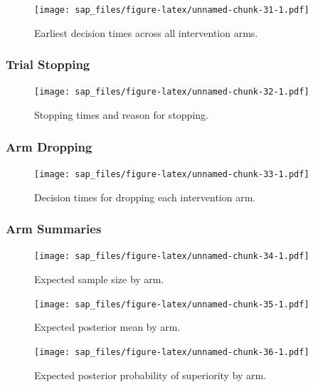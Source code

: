 \documentclass[
  bibliography=totoc]{scrreprt}
\begin{document}
\begin{figure}
\centering
\texttt{[image: sap\_files/figure-latex/unnamed-chunk-31-1.pdf]}
\caption{\label{fig:unnamed-chunk-31}Earliest decision times across all intervention arms.}
\end{figure}

\clearpage

\hypertarget{trial-stopping-2}{%
\subsubsection{Trial Stopping}\label{trial-stopping-2}}

\begin{figure}
\centering
\texttt{[image: sap\_files/figure-latex/unnamed-chunk-32-1.pdf]}
\caption{\label{fig:unnamed-chunk-32}Stopping times and reason for stopping.}
\end{figure}

\clearpage

\hypertarget{arm-dropping-2}{%
\subsubsection{Arm Dropping}\label{arm-dropping-2}}

\begin{figure}
\centering
\texttt{[image: sap\_files/figure-latex/unnamed-chunk-33-1.pdf]}
\caption{\label{fig:unnamed-chunk-33}Decision times for dropping each intervention arm.}
\end{figure}

\clearpage

\hypertarget{arm-summaries-2}{%
\subsubsection{Arm Summaries}\label{arm-summaries-2}}

\begin{figure}
\centering
\texttt{[image: sap\_files/figure-latex/unnamed-chunk-34-1.pdf]}
\caption{\label{fig:unnamed-chunk-34}Expected sample size by arm.}
\end{figure}

\begin{figure}
\centering
\texttt{[image: sap\_files/figure-latex/unnamed-chunk-35-1.pdf]}
\caption{\label{fig:unnamed-chunk-35}Expected posterior mean by arm.}
\end{figure}

\begin{figure}
\centering
\texttt{[image: sap\_files/figure-latex/unnamed-chunk-36-1.pdf]}
\caption{\label{fig:unnamed-chunk-36}Expected posterior probability of superiority by arm.}
\end{figure}
\end{document}
